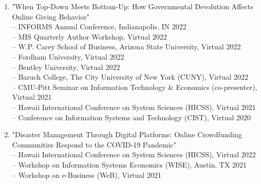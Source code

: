 \documentclass[margin,line]{resume}
\begin{document}
\begin{resume}
\begin{enumerate}[topsep=0pt, leftmargin=*]
 	     \item "When Top-Down Meets Bottom-Up: How Governmental Devolution Affects Online Giving Behavior"\\[0.3em]
 	          -- INFORMS Annual Conference, Indianapolis, IN \hfill  2022\\
 	          -- MIS Quarterly Author Workshop, Virtual \hfill 2022\\
 	           -- W.P. Carey School of Business, Arizona State University, Virtual \hfill2022\\
 	           -- Fordham University, Virtual  \hfill2022\\
 	           -- Bentley University, Virtual  \hfill2022\\
 	           -- Baruch College, The City University of New York (CUNY), Virtual \hfill2022\\
 	           -- CMU-Pitt Seminar on Information Technology \& Economics (co-presenter), Virtual \hfill2021\\
 	           -- Hawaii International Conference on System Sciences (HICSS), Virtual \hfill2021\\
 	           -- Conference on Information Systems and Technology (CIST), Virtual \hfill2020\\ 	      
\newpage

 	     \item "Disaster Management Through Digital Platforms: Online Crowdfunding Communities Respond to the COVID-19 Pandemic"\\[0.3em]
             -- Hawaii International Conference on System Sciences (HICSS), Virtual \hfill 2022\\
 	           -- Workshop on Information Systems Economics (WISE), Austin, TX \hfill 2021\\
 	           -- Workshop on e-Business (WeB), Virtual \hfill 2021\\
              

\end{enumerate}
\end{resume}
\end{document}

